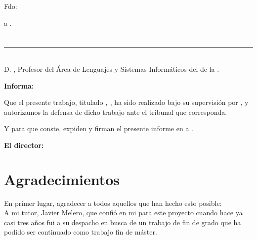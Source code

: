 \vspace{6cm}

\noindent Fdo: \myName

\vspace{2cm}

\begin{flushright}
\myLocation a \myTime.
\end{flushright}


\chapter*{}
\thispagestyle{empty}

\noindent\rule[-1ex]{\textwidth}{2pt}\\[4.5ex]

D. \textbf{\myProf}, Profesor del Área de Lenguajes y Sistemas Informáticos del \myDepartment de la \myUni.

\vspace{0.5cm}

\textbf{Informa:}

\vspace{0.5cm}

Que el presente trabajo, titulado \textit{\textbf{\myTitle, \mySubtitle}}, ha sido realizado bajo su supervisión por \textbf{\myName}, y autorizamos la defensa de dicho trabajo ante el tribunal que corresponda.

\vspace{0.5cm}

Y para que conste, expiden y firman el presente informe en \myLocation a \myTime.

\vspace{1cm}

\textbf{El director:}

\vspace{5cm}

\noindent \textbf{\myProf}

\chapter*{Agradecimientos}
\thispagestyle{empty}

\vspace{1cm}

En primer lugar, agradecer a todos aquellos que han hecho esto posible: 
\\

A mi tutor, Javier Melero, que confió en mi para este proyecto cuando hace ya casi tres años fui a su despacho en busca de un trabajo de fin de grado que ha podido ser continuado como trabajo fin de máster. 
\\

